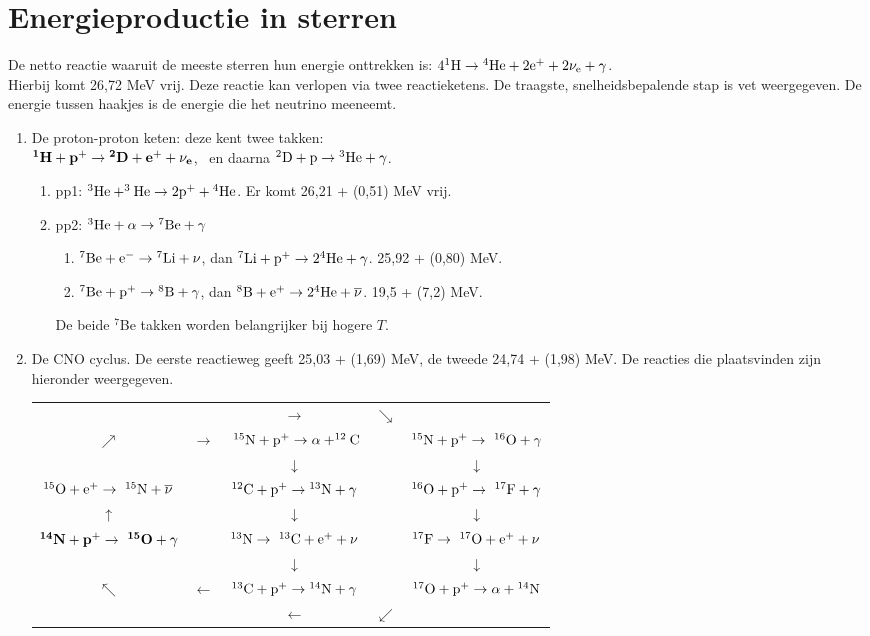\section{Energieproductie in sterren}
De netto reactie waaruit de meeste sterren hun energie onttrekken is:
$\rm 4 ^1H\rightarrow{}^4He+2e^++2\nu_{\rm e}+\gamma$.\\
Hierbij komt 26,72 MeV vrij. Deze reactie kan verlopen via twee reactieketens.
De traagste, snelheidsbepalende stap is vet weergegeven. De energie tussen
haakjes is de energie die het neutrino meeneemt.
\begin{enumerate}
\item De proton-proton keten: deze kent twee takken:\\
\boldmath$\bf ^1H+p^+\rightarrow{}^2D+e^++\nu_{\bf e}$,\unboldmath
~en daarna $\rm ^2D+p\rightarrow{}^3He+\gamma$.
      \begin{enumerate}
      \item pp1: $\rm ^3He+^3He\rightarrow2p^++{}^4He$. Er komt 26,21 + (0,51)
            MeV vrij.
      \item pp2: $\rm ^3He+\alpha\rightarrow{}^7Be+\gamma$
            \begin{enumerate}
            \item $\rm ^7Be+e^-\rightarrow{^7Li}+\nu$, dan $\rm ^7Li+p^+\rightarrow2 ^4He+\gamma$.
                  25,92 + (0,80) MeV.
            \item $\rm ^7Be+p^+\rightarrow{^8B}+\gamma$, dan $\rm ^8B+e^+\rightarrow2^4He+\overline{\nu}$.
                  19,5 + (7,2) MeV.
            \end{enumerate}
            De beide $^7$Be takken worden belangrijker bij hogere $T$.
      \end{enumerate}
\item De CNO cyclus. De eerste reactieweg geeft 25,03 + (1,69) MeV, de tweede
24,74 + (1,98) MeV. De reacties die plaatsvinden zijn hieronder weergegeven.
\npar
\begin{tabular}{ccccc}
&&$\longrightarrow$&$\searrow$&\\
$\nearrow$&$\rightarrow$&$\rm~^{15}N+p^+\rightarrow\alpha+^{12}C$&&$\rm^{15}N+p^+\rightarrow~^{16}O+\gamma$\\
&&$\downarrow$&&$\downarrow$\\
$\rm^{15}O+e^+\rightarrow~^{15}N+\overline{\nu}$&&$\rm^{12}C+p^+\rightarrow{}^{13}N+\gamma$&&$\rm^{16}O+p^+\rightarrow~^{17}F+\gamma$\\
$\uparrow$&&$\downarrow$&&$\downarrow$\\
\boldmath$\bf ^{14}N+p^+\rightarrow~^{15}O+\gamma$\unboldmath&&$\rm^{13}N\rightarrow~^{13}C+e^++\nu$&&$\rm^{17}F\rightarrow~^{17}O+e^++\nu$\\
&&$\downarrow$&&$\downarrow$\\
$\nwarrow$&$\leftarrow$&$\rm ^{13}C+p^+\rightarrow{}^{14}N+\gamma$&&$\rm^{17}O+p^+\rightarrow\alpha+{}^{14}N$\\
&&$\longleftarrow$&$\swarrow$&
\end{tabular}
\end{enumerate}


